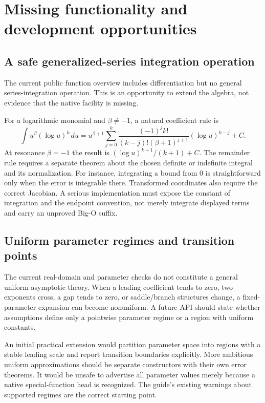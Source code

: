 \documentclass[11pt,letterpaper]{article}
\newcommand{\code}[1]{\texttt{\detokenize{#1}}}
\begin{document}
\section{Missing functionality and development opportunities}
\subsection{A safe generalized-series integration operation}
The current public function overview includes differentiation but no general series-integration operation. This is an opportunity to extend the algebra, not evidence that the native \code{AsymptoticIntegrate} facility is missing.\cite{guide,wl-integrate}

For a logarithmic monomial and $\beta\ne-1$, a natural coefficient rule is
\begin{equation}
 \int u^\beta(\log u)^k\,du
 =u^{\beta+1}\sum_{j=0}^k
 \frac{(-1)^j k!}{(k-j)!(\beta+1)^{j+1}}
 (\log u)^{k-j}+C.
\end{equation}
At resonance $\beta=-1$ the result is $(\log u)^{k+1}/(k+1)+C$. The remainder rule requires a separate theorem about the chosen definite or indefinite integral and its normalization. For instance, integrating a bound from $0$ is straightforward only when the error is integrable there. Transformed coordinates also require the correct Jacobian. A serious implementation must expose the constant of integration and the endpoint convention, not merely integrate displayed terms and carry an unproved Big-O suffix.

\subsection{Uniform parameter regimes and transition points}
The current real-domain and parameter checks do not constitute a general uniform asymptotic theory. When a leading coefficient tends to zero, two exponents cross, a gap tends to zero, or saddle/branch structures change, a fixed-parameter expansion can become nonuniform. A future API should state whether assumptions define only a pointwise parameter regime or a region with uniform constants.

An initial practical extension would partition parameter space into regions with a stable leading scale and report transition boundaries explicitly. More ambitious uniform approximations should be separate constructors with their own error theorems. It would be unsafe to advertise all parameter values merely because a native special-function head is recognized. The guide's existing warnings about supported regimes are the correct starting point.\cite{guide,native}
\end{document}
